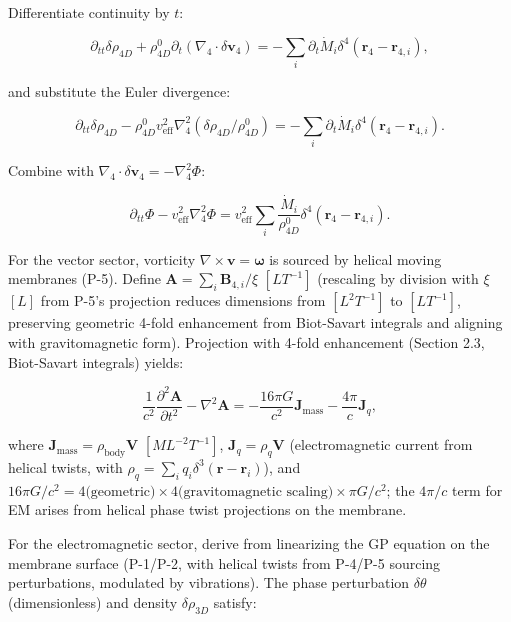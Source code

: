 Differentiate continuity by $t$:

\begin{equation}
\partial_{tt} \delta \rho_{4D} + \rho_{4D}^0 \partial_t (\nabla_4 \cdot \delta \mathbf{v}_4) = -\sum_i \partial_t \dot{M}_i \delta^4(\mathbf{r}_4 - \mathbf{r}_{4,i}),
\end{equation}

and substitute the Euler divergence:

\begin{equation}
\partial_{tt} \delta \rho_{4D} - \rho_{4D}^0 v_{\text{eff}}^2 \nabla_4^2 (\delta \rho_{4D} / \rho_{4D}^0) = -\sum_i \partial_t \dot{M}_i \delta^4(\mathbf{r}_4 - \mathbf{r}_{4,i}).
\end{equation}

Combine with $\nabla_4 \cdot \delta \mathbf{v}_4 = -\nabla_4^2 \Phi$:

\begin{equation}
\partial_{tt} \Phi - v_{\text{eff}}^2 \nabla_4^2 \Phi = v_{\text{eff}}^2 \sum_i \frac{\dot{M}_i}{\rho_{4D}^0} \delta^4(\mathbf{r}_4 - \mathbf{r}_{4,i}).
\end{equation}

For the vector sector, vorticity $\nabla \times \mathbf{v} = \boldsymbol{\omega}$ is sourced by helical moving membranes (P-5). Define $\mathbf{A} = \sum_i \mathbf{B}_{4,i} / \xi$ $[L T^{-1}]$ (rescaling by division with $\xi$ $[L]$ from P-5's projection reduces dimensions from $[L^2 T^{-1}]$ to $[L T^{-1}]$, preserving geometric 4-fold enhancement from Biot-Savart integrals and aligning with gravitomagnetic form). Projection with 4-fold enhancement (Section 2.3, Biot-Savart integrals) yields:

\begin{equation}
\frac{1}{c^2} \frac{\partial^2 \mathbf{A}}{\partial t^2} - \nabla^2 \mathbf{A} = -\frac{16\pi G}{c^2} \mathbf{J}_{\text{mass}} - \frac{4\pi}{c} \mathbf{J}_q,
\end{equation}

where $\mathbf{J}_{\text{mass}} = \rho_{\text{body}} \mathbf{V}$ $[M L^{-2} T^{-1}]$, $\mathbf{J}_q = \rho_q \mathbf{V}$ (electromagnetic current from helical twists, with $\rho_q = \sum_i q_i \delta^3(\mathbf{r} - \mathbf{r}_i)$), and $16\pi G/c^2 = 4 \text{(geometric)} \times 4 \text{(gravitomagnetic scaling)} \times \pi G/c^2$; the $4\pi/c$ term for EM arises from helical phase twist projections on the membrane.

For the electromagnetic sector, derive from linearizing the GP equation on the membrane surface (P-1/P-2, with helical twists from P-4/P-5 sourcing perturbations, modulated by vibrations). The phase perturbation $\delta \theta$ (dimensionless) and density $\delta \rho_{3D}$ satisfy:

